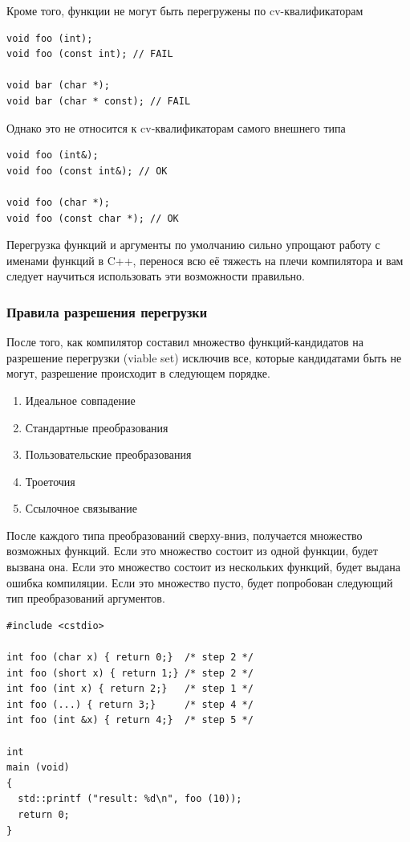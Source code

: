\documentclass[a4paper,12pt,oneside]{article}
\begin{document}
Кроме того, функции не могут быть перегружены по cv-квалификаторам

\begin{lstlisting}
void foo (int);
void foo (const int); // FAIL

void bar (char *);
void bar (char * const); // FAIL
\end{lstlisting}

Однако это не относится к cv-квалификаторам самого внешнего типа

\begin{lstlisting}
void foo (int&);
void foo (const int&); // OK

void foo (char *);
void foo (const char *); // OK
\end{lstlisting}

Перегрузка функций и аргументы по умолчанию сильно упрощают работу с именами функций в C++, перенося всю её тяжесть на плечи компилятора и вам следует научиться использовать эти возможности правильно.

\subsubsection{Правила разрешения перегрузки}\label{Overloading}

После того, как компилятор составил множество функций-кандидатов на разрешение перегрузки (viable set) исключив все, которые кандидатами быть не могут, разрешение происходит в следующем порядке.

\begin{enumerate}
\item Идеальное совпадение
\item Стандартные преобразования
\item Пользовательские преобразования
\item Троеточия
\item Ссылочное связывание
\end{enumerate}

После каждого типа преобразований сверху-вниз, получается множество возможных функций. Если это множество состоит из одной функции, будет вызвана она. Если это множество состоит из нескольких функций, будет выдана ошибка компиляции. Если это множество пусто, будет попробован следующий тип преобразований аргументов.

\begin{lstlisting}
#include <cstdio>

int foo (char x) { return 0;}  /* step 2 */
int foo (short x) { return 1;} /* step 2 */
int foo (int x) { return 2;}   /* step 1 */
int foo (...) { return 3;}     /* step 4 */
int foo (int &x) { return 4;}  /* step 5 */

int
main (void)
{
  std::printf ("result: %d\n", foo (10));
  return 0;
}
\end{lstlisting}
\end{document}
